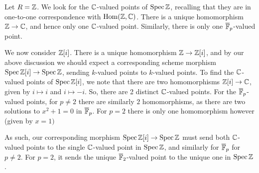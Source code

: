 \begin{example}
  Let $R=\mathbb{Z}$. We look for the $\mathbb{C}$-valued points of $\operatorname{Spec}\mathbb{Z}$, recalling that they are in one-to-one correspondence with $\mathrm{Hom}(\mathbb{Z},\mathbb{C})$. There is a unique homomorphism $\mathbb{Z}\to\mathbb{C}$, and hence only one $\mathbb{C}$-valued point. Similarly, there is only one $\overline{\mathbb{F}}_p$-valued point.
  
  We now consider $\mathbb{Z}[i]$. There is a unique homomorphism $\mathbb{Z}\to\mathbb{Z}[i]$, and by our above discussion we should expect a corresponding scheme morphism $\operatorname{Spec}\mathbb{Z}[i]\to\operatorname{Spec}\mathbb{Z}$, sending $k$-valued points to $k$-valued points. To find the $\mathbb{C}$-valued points of $\operatorname{Spec}\mathbb{Z}[i]$, we note that there are two homomorphisms $\mathbb{Z}[i]\to\mathbb{C}$, given by $i\mapsto i$ and $i\mapsto -i$. So, there are 2 distinct $\mathbb{C}$-valued points. For the $\overline{\mathbb{F}}_p$-valued points, for $p\ne2$ there are similarly $2$ homomorphisms, as there are two solutions to $x^2+1 = 0$ in \(\overline{\mathbb{F}}_p\). For $p=2$ there is only one homomorphism however (given by \(x = 1)\)
  
    As such, our corresponding morphism $\operatorname{Spec}\mathbb{Z}[i]\to\operatorname{Spec}\mathbb{Z}$ must send both $\mathbb{C}$-valued points to the single \(\mathbb{C}\)-valued point in $\operatorname{Spec}\mathbb{Z}$, and similarly for $\overline{\mathbb{F}}_p$ for $p\ne2$. For $p=2$, it sends the unique $\overline{\mathbb{F}}_2$-valued point to the unique one in $\operatorname{Spec}\mathbb{Z}$.
\end{example}


